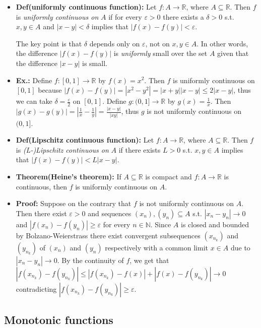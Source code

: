\documentclass{article}
\begin{document}
\begin{itemize}
\item \textbf{Def(uniformly continuous function):} Let $f: A \to \mathbb{R}$, where $A \subseteq \mathbb{R}$. Then $f$ is \emph{uniformly continuous on} $A$ if for every $\varepsilon > 0$ there exists a $\delta > 0$ s.t. $x, y \in A$ and $|x - y| < \delta$ implies that $|f(x) - f(y)| < \varepsilon$.

The key point is that $\delta$ depends only on $\varepsilon$, not on $x,y \in A$. In other words, the difference $|f(x) - f(y)|$ is \emph{uniformly} small over the set $A$ given that the difference $|x - y|$ is small.

\item \textbf{Ex.:} Define $f:[0,1] \to \mathbb{R}$ by $f(x) = x^2$. Then $f$ is uniformly continuous on $[0,1]$ because $|f(x) - f(y)| = |x^2 - y^2| = |x + y||x - y| \leq 2|x - y|$, thus we can take $\delta = \frac{\varepsilon}{2}$ on $[0,1]$. Define $g: (0,1] \to \mathbb{R}$ by $g(x) = \frac{1}{x}$. Then $|g(x) - g(y)| = \left|\frac{1}{x} - \frac{1}{y}\right| = \frac{|x - y|}{|xy|}$, thus $g$ is not uniformly continuous on $(0,1]$.

\item \textbf{Def(Lipschitz continuous function):} Let $f: A \to \mathbb{R}$, where $A \subseteq \mathbb{R}$. Then $f$ is \emph{(L-)Lipschitz continuous on} $A$ if there exists $L > 0$ s.t. $x, y \in A$ implies that $|f(x) - f(y)| < L|x - y|$.

\item \textbf{Theorem(Heine's theorem):} If $A \subseteq \mathbb{R}$ is compact and $f: A \to \mathbb{R}$ is continuous, then $f$ is uniformly continuous on $A$.

\item \textbf{Proof:} Suppose on the contrary that $f$ is not uniformly continuous on $A$. Then there exist $\varepsilon > 0$ and sequences $(x_n), (y_n) \subseteq A$ s.t. $|x_n - y_n| \to 0$ and $|f(x_n) - f(y_n)| \geq \varepsilon$ for every $n \in \mathbb{N}$. Since $A$ is closed and bounded by Bolzano-Weierstrass there exist convergent subsequences $(x_{n_k})$ and $(y_{n_k})$ of $(x_n)$ and $(y_n)$ respectively with a common limit $x \in A$ due to $|x_n - y_n| \to 0$. By the continuity of $f$, we get that $|f(x_{n_k}) - f(y_{n_k})| \leq |f(x_{n_k}) - f(x)| + |f(x) - f(y_{n_k})| \to 0$ contradicting $|f(x_{n_k}) - f(y_{n_k})| \geq \varepsilon$.
\end{itemize}

\subsection{Monotonic functions}
\end{document}
